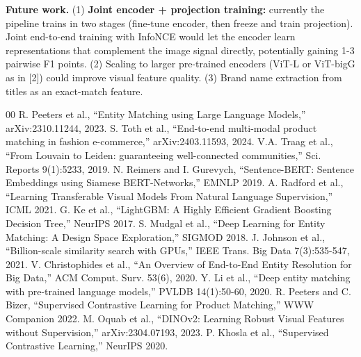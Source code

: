 \documentclass[10pt,twocolumn,a4paper]{article}
\begin{document}
\textbf{Future work.} (1) \textbf{Joint encoder + projection training:} currently the pipeline trains in two stages (fine-tune encoder, then freeze and train projection). Joint end-to-end training with InfoNCE would let the encoder learn representations that complement the image signal directly, potentially gaining 1-3 pairwise F1 points. (2) Scaling to larger pre-trained encoders (ViT-L or ViT-bigG as in [2]) could improve visual feature quality. (3) Brand name extraction from titles as an exact-match feature. 

\begin{thebibliography}{00}
 R. Peeters et al., ``Entity Matching using Large Language Models,'' arXiv:2310.11244, 2023.
 S. Toth et al., ``End-to-end multi-modal product matching in fashion e-commerce,'' arXiv:2403.11593, 2024.
 V.A. Traag et al., ``From Louvain to Leiden: guaranteeing well-connected communities,'' Sci. Reports 9(1):5233, 2019.
 N. Reimers and I. Gurevych, ``Sentence-BERT: Sentence Embeddings using Siamese BERT-Networks,'' EMNLP 2019.
 A. Radford et al., ``Learning Transferable Visual Models From Natural Language Supervision,'' ICML 2021.
 G. Ke et al., ``LightGBM: A Highly Efficient Gradient Boosting Decision Tree,'' NeurIPS 2017.
 S. Mudgal et al., ``Deep Learning for Entity Matching: A Design Space Exploration,'' SIGMOD 2018.
 J. Johnson et al., ``Billion-scale similarity search with GPUs,'' IEEE Trans. Big Data 7(3):535-547, 2021.
 V. Christophides et al., ``An Overview of End-to-End Entity Resolution for Big Data,'' ACM Comput. Surv. 53(6), 2020.
 Y. Li et al., ``Deep entity matching with pre-trained language models,'' PVLDB 14(1):50-60, 2020.
 R. Peeters and C. Bizer, ``Supervised Contrastive Learning for Product Matching,'' WWW Companion 2022.
 M. Oquab et al., ``DINOv2: Learning Robust Visual Features without Supervision,'' arXiv:2304.07193, 2023.
 P. Khosla et al., ``Supervised Contrastive Learning,'' NeurIPS 2020.
\end{thebibliography}
\end{document}
